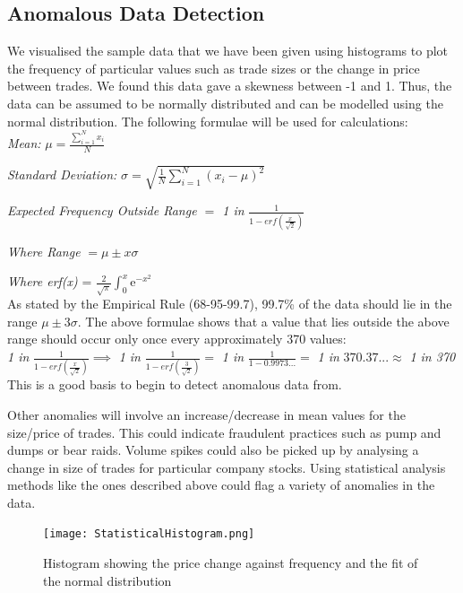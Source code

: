 \documentclass[11pt, oneside, a4paper]{article}
\begin{document}
\subsection{Anomalous Data Detection}

We visualised the sample data that we have been given using histograms to plot
the frequency of particular values such as trade sizes or the change in price
between trades. We found this data gave a skewness between -1 and 1. Thus, the
data can be assumed to be normally distributed and can be modelled using the
normal distribution. The following formulae will be used for calculations:\\

\textit{Mean: } $\mu = \frac{\sum_{i=1}^{N} x_{i}}{N}$

\textit{Standard Deviation: } $\sigma = \sqrt{\frac{1}{N}\sum_{i=1}^{N}(x_{i} - \mu)^2}$

\textit{Expected Frequency Outside Range $=$ 1 in }$\frac{1}{1-erf(\frac{x}{\sqrt{2}})}$

\textit{Where Range }$ = \mu \pm x\sigma$

\textit{Where erf(x) } = $\frac{2}{\sqrt{\pi}}\int_0^x\mathrm{e}^{-x^2}$\\

As stated by the Empirical Rule (68-95-99.7), 99.7\% of the data should lie in the
range $\mu \pm 3\sigma$. The above formulae shows that a value that lies outside
the above range should occur only once every approximately 370 values:\\

\textit{1 in }$\frac{1}{1-erf(\frac{x}{\sqrt{2}})} \implies $ \textit{1 in }$\frac{1}{1-erf(\frac{3}{\sqrt{2}})} = $ \textit{1 in }$\frac{1}{1-0.9973...} = $ \textit{1 in }$370.37... \approx $ \textit{1 in 370} \\

This is a good basis to begin to detect anomalous data from.

Other anomalies will involve an increase/decrease in mean values for the size/price
of trades. This could indicate fraudulent practices such as pump and dumps or bear
raids. Volume spikes could also be picked up by analysing a change in size of trades
for particular company stocks. Using statistical analysis methods like the ones
described above could flag a variety of anomalies in the data.

\begin{figure}[h]
	\centering
		\texttt{[image: StatisticalHistogram.png]}
	\caption{Histogram showing the price change against frequency and the fit of the normal distribution}
	\label{StatisticalHistogram}
\end{figure}
\end{document}
